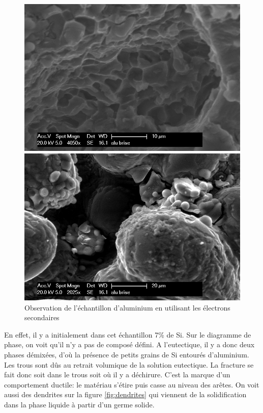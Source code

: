 \documentclass[a4paper,12pt]{article}
\begin{document}
\begin{figure}
\begin{minipage}[c]{.5\linewidth}
\centering
\includegraphics[width=1\textwidth]{images/alu_arretes.png}
 \end{minipage}\hfill
\begin{minipage}[c]{.5\linewidth}
\centering
\includegraphics[width=1\textwidth]{images/alu_brise.png}
\end{minipage}
\caption{Observation de l'échantillon d'aluminium en utilisant les électrons secondaires}
\label{fig:alu_reliefs}
\end{figure}


En effet, il y a initialement dans cet échantillon 7\% de Si. Sur le diagramme de phase, on voit qu'il n'y a pas de composé défini. A l'eutectique, il y a donc deux phases démixées, d'où la présence de petits grains de Si entourés d'aluminium. Les trous sont dûs au retrait volumique de la solution eutectique. La fracture se fait donc soit dans le trous soit où il y a déchirure. C'est la marque d'un comportement ductile: le matériau s'étire puis casse au niveau des arêtes. On voit aussi des dendrites sur la figure \ref{fig:dendrites} qui viennent de la solidification dans la phase liquide à partir d'un germe solide.
\end{document}
